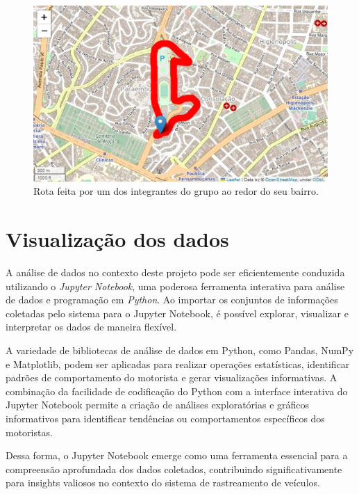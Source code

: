 \begin{figure}[hp]
    \centering
    
    \includegraphics[scale=0.6]{figures/rota.png}
    
    \caption{Rota feita por um dos integrantes do grupo ao redor do seu bairro.}
    
    \label{fig:rota}
\end{figure}

\section{Visualização dos dados}
A análise de dados no contexto deste projeto pode ser eficientemente conduzida utilizando o \textit{Jupyter Notebook}, uma poderosa ferramenta interativa para análise de dados e programação em \textit{Python}. Ao importar os conjuntos de informações coletadas pelo sistema para o Jupyter Notebook, é possível explorar, visualizar e interpretar os dados de maneira flexível. 

A variedade de bibliotecas de análise de dados em Python, como Pandas, NumPy e Matplotlib, podem ser aplicadas para realizar operações estatísticas, identificar padrões de comportamento do motorista e gerar visualizações informativas. A combinação da facilidade de codificação do Python com a interface interativa do Jupyter Notebook permite a criação de análises exploratórias e gráficos informativos  para identificar tendências ou comportamentos específicos dos motoristas.

Dessa forma, o Jupyter Notebook emerge como uma ferramenta essencial para a compreensão aprofundada dos dados coletados, contribuindo significativamente para insights valiosos no contexto do sistema de rastreamento de veículos.

